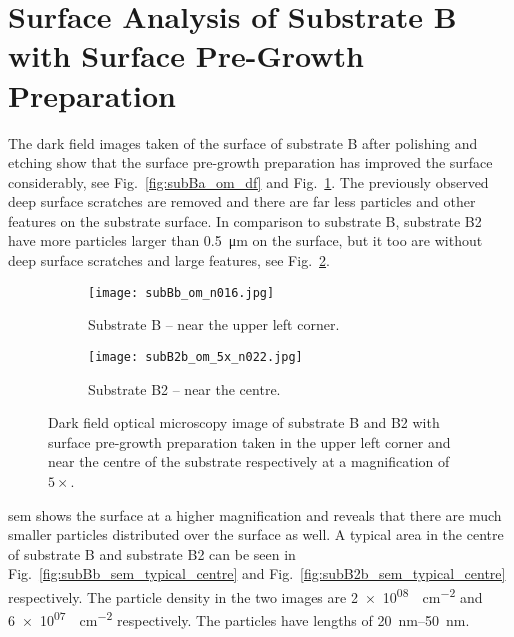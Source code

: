 \clearpage
\section[Surface Analysis of Substrate B with Surface Pre-Growth Preparation]{Surface Analysis of Substrate B with Surface Pre-Growth Preparation%
   }\label{sec:subBb}
   
The dark field images taken of the surface of substrate B after polishing and etching show that the surface pre-growth preparation has improved the surface considerably, see Fig.~\ref{fig:subBa_om_df} and Fig.~\ref{fig:subBb_om_df}. The previously observed deep surface scratches are removed and there are far less particles and other features on the substrate surface. In comparison to substrate B, substrate B2 have more particles larger than \SI{0.5}{\micro\metre} on the surface, but it too are without deep surface scratches and large features, see Fig.~\ref{fig:subB2b_om_df}.

\begin{figure}[htbp]
    \centering
    \begin{subfigure}[t]{0.8\linewidth}
    \texttt{[image: subBb\_om\_n016.jpg]}
    \caption{Substrate B -- near the upper left corner.}\label{fig:subBb_om_df}
    \end{subfigure}
    \par\bigskip
    \begin{subfigure}[t]{0.8\linewidth}
    \texttt{[image: subB2b\_om\_5x\_n022.jpg]}
    \caption{Substrate B2 -- near the centre.}\label{fig:subB2b_om_df}
    \end{subfigure}
    \caption[Dark field optical microscopy image of substrate B and B2 with surface pre-growth preparation.]{Dark field optical microscopy image of substrate B and B2 with surface pre-growth preparation taken in the upper left corner and near the centre of the substrate respectively at a magnification of $5\times$.}\label{fig:subBb_and_subB2b_om_df}
\end{figure}

\Ac{sem} shows the surface at a higher magnification and reveals that there are much smaller particles distributed over the surface as well. A typical area in the centre of substrate B and substrate B2 can be seen in Fig.~\ref{fig:subBb_sem_typical_centre} and Fig.~\ref{fig:subB2b_sem_typical_centre} respectively. The particle density in the two images are \SI{2e+08}{\particle\centi\metre^{-2}} and \SI{6e+07}{\particle\centi\metre^{-2}} respectively. The particles have lengths of \SIrange{20}{50}{\nano\metre}. 

